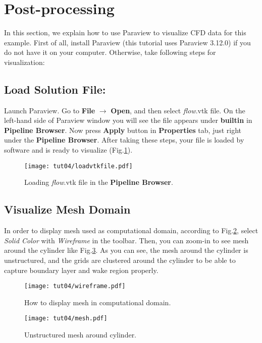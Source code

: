 \section{Post-processing}
In this section, we explain how to use Paraview to visualize CFD data for this example. First of all, install Paraview (this tutorial uses Paraview 3.12.0) if you do not have it on your computer. Otherwise, take following steps for visualization:
\subsection{Load Solution File:}
Launch Paraview. Go to \textbf{File} $\rightarrow$ \textbf{Open}, and then select \textit{flow}.vtk file. On the left-hand side of Paraview window you will see the file appears under \textbf{builtin} in \textbf{Pipeline Browser}. Now press \textbf{Apply} button in \textbf{Properties} tab, just right under the \textbf{Pipeline Browser}. After taking these steps, your file is loaded by software and is ready to visualize (Fig.\ref{fig4:load}).
\begin{figure}[htbp]
    \centering
    \texttt{[image: tut04/loadvtkfile.pdf]}
    \caption{Loading \textit{flow}.vtk file in the \textbf{Pipeline Browser}.}
    \label{fig4:load}
\end{figure}
\subsection{Visualize Mesh Domain}
In order to display mesh used as computational domain, according to Fig.\ref{fig4:wireframe_4}, select \textit{Solid Color} with \textit{Wireframe} in the toolbar. Then, you can zoom-in to see mesh around the cylinder like Fig.\ref{fig4:mesh_4}. As you can see, the mesh around the cylinder is unstructured, and the grids are clustered around the cylinder to be able to capture boundary layer and wake region properly.
\begin{figure}[htbp]
    \centering
    \texttt{[image: tut04/wireframe.pdf]}
    \caption{How to display mesh in computational domain.}
    \label{fig4:wireframe_4}
\end{figure}
\begin{figure}[htbp]
    \centering
    \texttt{[image: tut04/mesh.pdf]}
    \caption{Unstructured mesh around cylinder.}
    \label{fig4:mesh_4}
\end{figure}
